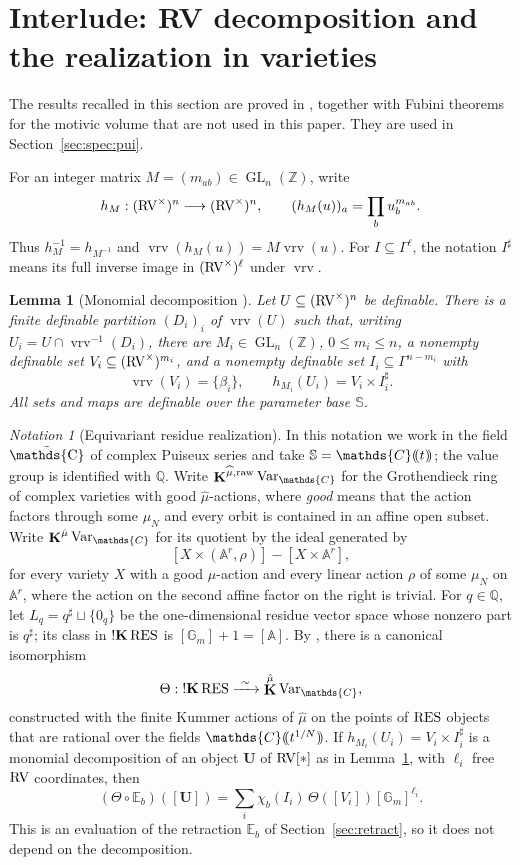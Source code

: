 \documentclass[12pt]{amsart}
\theoremstyle{plain}
\newtheorem{lem}[thm]{Lemma}
\theoremstyle{definition}
\theoremstyle{remark}
\newtheorem{nota}[thm]{Notation}
\numberwithin{equation}{section}
\theoremstyle{plain}
\newcommand{\RV}{\textup{RV}}
\DeclareMathOperator{\GL}{GL}
\newcommand{\Z}{\mathds{Z}}
\newcommand{\A}{\mathds{A}}
\newcommand{\C}{\mathds{C}}
\newcommand{\G}{\mathds{G}}
\newcommand{\Q}{\mathds{Q}}
\newcommand{\0}{\emptyset}
\newcommand{\dpar}[1]{%
   (\mkern-4mu (#1 )\mkern-4mu )}
\newcommand{\bb}[1]{\mathbb{#1}}
\newcommand{\RES}{\textup{RES}}
\DeclareMathOperator{\ggk}{\mathbf{K}}
\DeclareMathOperator{\sggk}{!\mathbf{K}}
\DeclareMathOperator{\vrv}{vrv}
\newcommand{\var}{\textup{Var}}
\DeclareMathOperator{\puC}{\tilde \C}
\newcommand{\gmv}{\ggk^{\hat \mu}\var_{\C}}
\begin{document}
\section{Interlude: RV decomposition and the realization in varieties}\label{csndag}
The results recalled in this section are proved in \cite{FY:Fubini}, together with Fubini theorems for the motivic volume that are not used in this paper. They are used in Section~\ref{sec:spec:pui}.

For an integer matrix $M=(m_{ab})\in\GL_n(\Z)$, write
\[
 h_M:(\RV^\times)^n\longrightarrow(\RV^\times)^n,\qquad
 (h_M(u))_a=\prod_b u_b^{m_{ab}}.
\]
Thus $h_M^{-1}=h_{M^{-1}}$ and $\vrv(h_M(u))=M\vrv(u)$. For $I\subseteq\Gamma^\ell$, the notation $I^\sharp$ means its full inverse image in $(\RV^\times)^\ell$ under $\vrv$.

\begin{lem}[Monomial decomposition {\cite[Lemma~2.1]{FY:Fubini}}]\label{coh:decom}
Let $U\subseteq(\RV^\times)^n$ be definable. There is a finite definable partition $(D_i)_i$ of $\vrv(U)$ such that, writing $U_i=U\cap\vrv^{-1}(D_i)$, there are $M_i\in\GL_n(\Z)$, $0\leq m_i\leq n$, a nonempty definable set $V_i\subseteq(\RV^\times)^{m_i}$, and a nonempty definable set $I_i\subseteq\Gamma^{n-m_i}$ with
\[
 \vrv(V_i)=\{\beta_i\},\qquad
 h_{M_i}(U_i)=V_i\times I_i^\sharp .
\]
All sets and maps are definable over the parameter base $\mathbb S$.
\end{lem}

\begin{nota}[Equivariant residue realization]\label{bipo:gdv}
In this notation we work in the field $\puC$ of complex Puiseux series and take $\mathbb S = \C\dpar t$; the value group is identified with $\Q$. Write $\ggk^{\widehat\mu,\mathrm{raw}}\var_{\C}$ for the Grothendieck ring of complex varieties with good $\widehat\mu$-actions, where \emph{good} means that the action factors through some $\mu_N$ and every orbit is contained in an affine open subset. Write $\gmv$ for its quotient by the ideal generated by
\[
 [X\times(\A^r,\rho)]-[X\times\A^r],
\]
for every variety $X$ with a good $\widehat\mu$-action and every linear action $\rho$ of some $\mu_N$ on $\A^r$, where the action on the second affine factor on the right is trivial. For $q\in\Q$, let $L_q=q^\sharp\sqcup\{0_q\}$ be the one-dimensional residue vector space whose nonzero part is $q^\sharp$; its class in $\sggk\RES$ is $[\G_m]+1=[\A]$. By \cite[Notation~7.3]{FY:Fubini}, there is a canonical isomorphism
\[
 \Theta:\sggk\RES\xrightarrow{\ \sim\ }\gmv,
\]
constructed with the finite Kummer actions of $\widehat\mu$ on the points of $\RES$ objects that are rational over the fields $\C\dpar{t^{1/N}}$. If $h_{M_i}(U_i)=V_i\times I_i^\sharp$ is a monomial decomposition of an object $\bm U$ of $\RV[*]$ as in Lemma~\ref{coh:decom}, with $\ell_i$ free $\RV$ coordinates, then \cite[(7.1)]{FY:Fubini}
\begin{equation}\label{twist:C}
 (\Theta\circ\bb E_b)([\bm U])
   =\sum_i\chi_b(I_i)\,\Theta([V_i])[\G_m]^{\ell_i}.
\end{equation}
This is an evaluation of the retraction $\bb E_b$ of Section~\ref{sec:retract}, so it does not depend on the decomposition.
\end{nota}
\end{document}
